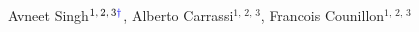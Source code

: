 Avneet Singh$^\mathrm{1,\,2,\,3\color{blue}{\dagger}}$, Alberto Carrassi$^\mathrm{1,\,2,\,3}$, Francois Counillon$^\mathrm{1,\,2,\,3}$